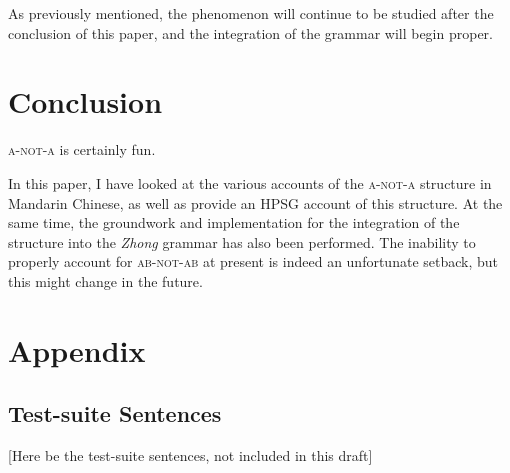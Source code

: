 \documentclass[12pt, UTF8]{article}
\begin{document}
As previously mentioned, the phenomenon will continue to be studied after the conclusion of this paper, and the integration of the grammar will begin proper.


\section{Conclusion}

\textsc{a-not-a} is certainly fun.

In this paper, I have looked at the various accounts of the \textsc{a-not-a} structure in Mandarin Chinese, as well as provide an HPSG account of this structure. At the same time, the groundwork and implementation for the integration of the structure into the \textit{Zhong} grammar has also been performed. The inability to properly account for \textsc{ab-not-ab} at present is indeed an unfortunate setback, but this might change in the future.

\newpage




\newpage

\section{Appendix}

\subsection{Test-suite Sentences}

[Here be the test-suite sentences, not included in this draft]
\end{document}
